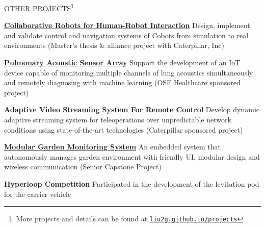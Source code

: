 \documentclass{lib/resume} %
\begin{document}
\begin{rSection}{OTHER PROJECTS\footnote{More projects and details can be found at \href{https://liu2g.github.io/projects}{\nolinkurl{liu2g.github.io/projects}}}}
    \vspace{-1em}
    \item \href{https://liu2g.github.io/cobots-sim/}{\textbf{Collaborative Robots for Human-Robot Interaction}} Design, implement and validate control and navigation systems of Cobots from simulation to real environments (Master's thesis \& alliance project with Caterpillar, Inc)
    \item \href{https://liu2g.github.io/pasta/}{\textbf{Pulmonary Acoustic Sensor Array}} Support the development of an IoT device capable of monitoring multiple channels of lung acoustics simultaneously and remotely diagnosing with machine learning (OSF Healthcare sponsored project)
    \item \href{https://liu2g.github.io/teleop-video/}{\textbf{Adaptive Video Streaming System For Remote Control}} {Develop dynamic adaptive streaming system for teleoperations over unpredictable network conditions using state-of-the-art technologies (Caterpillar sponsored project)}
    \item \href{https://github.com/liu2g/mgms}{\textbf{Modular Garden Monitoring System}} {An embedded system that autonomously manages garden environment with friendly UI, modular design and wireless communication (Senior Capstone Project)}
    \item \textbf{Hyperloop Competition} {Participated in the development of the levitation pod for the carrier vehicle}

\end{rSection}
\end{document}
